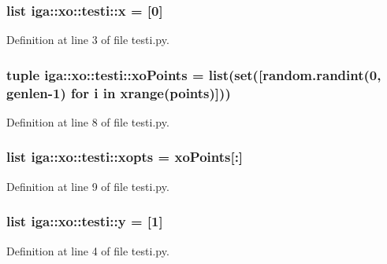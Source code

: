 \subsubsection{\setlength{\rightskip}{0pt plus 5cm}list {\bf iga::xo::testi::x} = [0]\hspace{0.3cm}{\tt  [static]}}\label{namespaceiga_1_1xo_1_1testi_ac6b9fd85c8bbd6ee925eefc9aefaabc}




Definition at line 3 of file testi.py.
\subsubsection{\setlength{\rightskip}{0pt plus 5cm}tuple {\bf iga::xo::testi::xoPoints} = list(set([random.randint(0, {\bf genlen}-1) for i in xrange({\bf points})]))\hspace{0.3cm}{\tt  [static]}}\label{namespaceiga_1_1xo_1_1testi_332ab7ab55ab558857f8934c6e8986d5}




Definition at line 8 of file testi.py.
\subsubsection{\setlength{\rightskip}{0pt plus 5cm}list {\bf iga::xo::testi::xopts} = {\bf xoPoints}[:]\hspace{0.3cm}{\tt  [static]}}\label{namespaceiga_1_1xo_1_1testi_16026c593a87efdfe624a5e4c5407e8c}




Definition at line 9 of file testi.py.
\subsubsection{\setlength{\rightskip}{0pt plus 5cm}list {\bf iga::xo::testi::y} = [1]\hspace{0.3cm}{\tt  [static]}}\label{namespaceiga_1_1xo_1_1testi_97a6f18e0ceb1ac9bead199bdab65014}




Definition at line 4 of file testi.py.